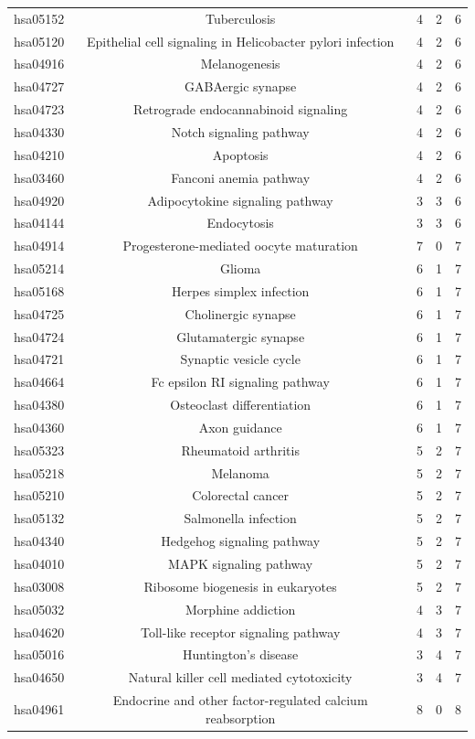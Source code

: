 \documentclass[Minh_PhD_thesis.tex]{subfiles}
\begin{document}
\begin{center}
\begin{longtable}{@{}ccccc@{}}
hsa05152	&Tuberculosis&	4&	2&	6\\
hsa05120	&Epithelial cell signaling in Helicobacter pylori infection&	4&	2&	6\\
hsa04916	&Melanogenesis&	4&	2&	6\\
hsa04727	&GABAergic synapse&	4&	2&	6\\
hsa04723	&Retrograde endocannabinoid signaling&	4&	2&	6\\
hsa04330	&Notch signaling pathway&	4&	2&	6\\
hsa04210	&Apoptosis&	4&	2&	6\\
hsa03460	&Fanconi anemia pathway&	4&	2&	6\\
hsa04920	&Adipocytokine signaling pathway&	3&	3&	6\\
hsa04144	&Endocytosis&	3&	3&	6\\
hsa04914	&Progesterone-mediated oocyte maturation&	7&	0&	7\\
hsa05214	&Glioma&	6&	1&	7\\
hsa05168	&Herpes simplex infection&	6&	1&	7\\
hsa04725	&Cholinergic synapse&	6&	1&	7\\
hsa04724	&Glutamatergic synapse&	6&	1&	7\\
hsa04721	&Synaptic vesicle cycle&	6&	1&	7\\
hsa04664	&Fc epsilon RI signaling pathway&	6&	1&	7\\
hsa04380	&Osteoclast differentiation&	6&	1&	7\\
hsa04360	&Axon guidance&	6&	1&	7\\
hsa05323	&Rheumatoid arthritis&	5&	2&	7\\
hsa05218	&Melanoma&	5&	2&	7\\
hsa05210	&Colorectal cancer&	5&	2&	7\\
hsa05132	&Salmonella infection&	5&	2&	7\\
hsa04340	&Hedgehog signaling pathway&	5&	2&	7\\
hsa04010	&MAPK signaling pathway&	5&	2&	7\\
hsa03008	&Ribosome biogenesis in eukaryotes&	5&	2&	7\\
hsa05032	&Morphine addiction&	4&	3&	7\\
hsa04620	&Toll-like receptor signaling pathway&	4&	3&	7\\
hsa05016	&Huntington's disease&	3&	4&	7\\
hsa04650	&Natural killer cell mediated cytotoxicity&	3&	4&	7\\
hsa04961	&Endocrine and other factor-regulated calcium reabsorption&	8&	0&	8\\

\end{longtable}
\end{center}
\end{document}

